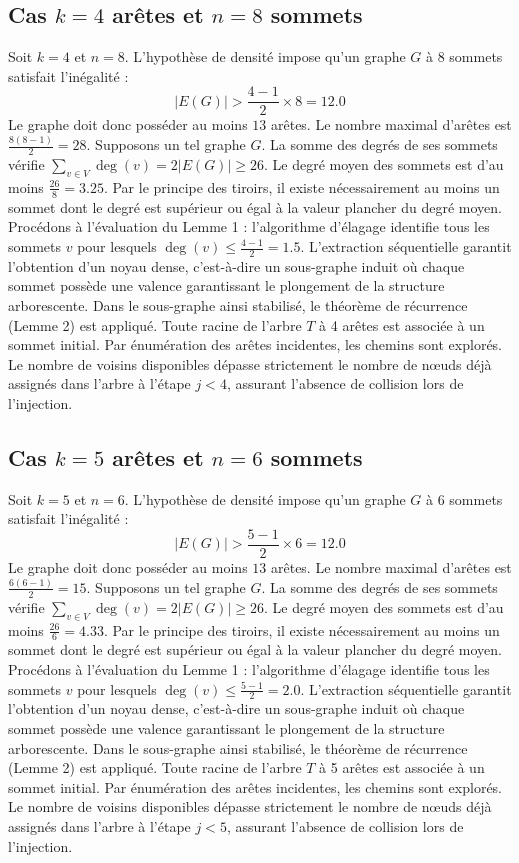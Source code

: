 \documentclass[12pt,a4paper]{article}
\begin{document}
\subsection{Cas $k = 4$ arêtes et $n = 8$ sommets}
Soit $k = 4$ et $n = 8$. L'hypothèse de densité impose qu'un graphe $G$ à 8 sommets satisfait l'inégalité :
$$ |E(G)| > \frac{4-1}{2} \times 8 = 12.0 $$
Le graphe doit donc posséder au moins $13$ arêtes. Le nombre maximal d'arêtes est $\frac{8(8-1)}{2} = 28$.
Supposons un tel graphe $G$. La somme des degrés de ses sommets vérifie $\sum_{v \in V} \deg(v) = 2|E(G)| \geq 26$.
Le degré moyen des sommets est d'au moins $\frac{26}{8} = 3.25$.
Par le principe des tiroirs, il existe nécessairement au moins un sommet dont le degré est supérieur ou égal à la valeur plancher du degré moyen.
Procédons à l'évaluation du Lemme 1 : l'algorithme d'élagage identifie tous les sommets $v$ pour lesquels $\deg(v) \leq \frac{4-1}{2} = 1.5$.
L'extraction séquentielle garantit l'obtention d'un noyau dense, c'est-à-dire un sous-graphe induit où chaque sommet possède une valence garantissant le plongement de la structure arborescente.
Dans le sous-graphe ainsi stabilisé, le théorème de récurrence (Lemme 2) est appliqué. Toute racine de l'arbre $T$ à 4 arêtes est associée à un sommet initial. Par énumération des arêtes incidentes, les chemins sont explorés. Le nombre de voisins disponibles dépasse strictement le nombre de nœuds déjà assignés dans l'arbre à l'étape $j < 4$, assurant l'absence de collision lors de l'injection.

\subsection{Cas $k = 5$ arêtes et $n = 6$ sommets}
Soit $k = 5$ et $n = 6$. L'hypothèse de densité impose qu'un graphe $G$ à 6 sommets satisfait l'inégalité :
$$ |E(G)| > \frac{5-1}{2} \times 6 = 12.0 $$
Le graphe doit donc posséder au moins $13$ arêtes. Le nombre maximal d'arêtes est $\frac{6(6-1)}{2} = 15$.
Supposons un tel graphe $G$. La somme des degrés de ses sommets vérifie $\sum_{v \in V} \deg(v) = 2|E(G)| \geq 26$.
Le degré moyen des sommets est d'au moins $\frac{26}{6} = 4.33$.
Par le principe des tiroirs, il existe nécessairement au moins un sommet dont le degré est supérieur ou égal à la valeur plancher du degré moyen.
Procédons à l'évaluation du Lemme 1 : l'algorithme d'élagage identifie tous les sommets $v$ pour lesquels $\deg(v) \leq \frac{5-1}{2} = 2.0$.
L'extraction séquentielle garantit l'obtention d'un noyau dense, c'est-à-dire un sous-graphe induit où chaque sommet possède une valence garantissant le plongement de la structure arborescente.
Dans le sous-graphe ainsi stabilisé, le théorème de récurrence (Lemme 2) est appliqué. Toute racine de l'arbre $T$ à 5 arêtes est associée à un sommet initial. Par énumération des arêtes incidentes, les chemins sont explorés. Le nombre de voisins disponibles dépasse strictement le nombre de nœuds déjà assignés dans l'arbre à l'étape $j < 5$, assurant l'absence de collision lors de l'injection.
\end{document}
